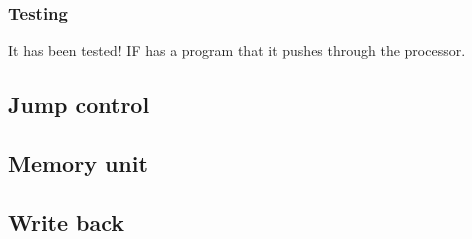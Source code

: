 \subsubsection*{Testing}
It has been tested! IF has a program that it pushes through the processor.

\subsection{Jump control}
\subsection{Memory unit}
\subsection{Write back}
